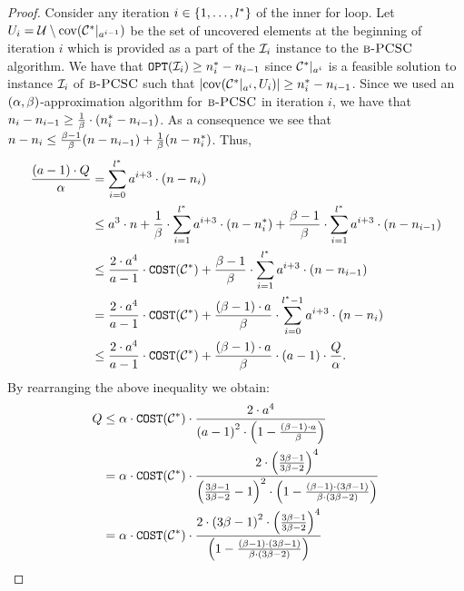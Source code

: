 \begin{proof}
        Consider any iteration $i\in \mathopen{}\left\{ 1,\dots,l^* \right\}$ of the inner for loop. Let $U_i=\mathcal{U}\setminus \operatorname{cov}\mathopen{}\left( \mathcal{C}^{*}|_{a^{i-1}} \right)$ be the set of uncovered elements at the beginning of iteration $i$ which is provided as a part of the $\mathcal{I}_i$ instance to the $\textup{\textsc{b-PCSC}}$ algorithm. We have that $\texttt{OPT}\mathopen{}\left( \mathcal{I}_i \right)\geq n_i^*-n_{i-1}$ since $\mathcal{C}^{*}|_{a^{i}}$ is a feasible solution to instance $\mathcal{I}_i$ of $\textup{\textsc{b-PCSC}}$ such that $\mathopen{}\left| \operatorname{cov}\mathopen{}\left( \mathcal{C}^{*}|_{a^{i}}, U_i \right) \right|\geq n_i^*-n_{i-1}$.
        Since we used an $\mathopen{}\left( \alpha, \beta \right)$-approximation algorithm for $\textup{\textsc{b-PCSC}}$ in iteration $i$, we have that $n_i-n_{i-1}\geq \frac{1}{\beta}\cdot\mathopen{}\left( n_i^*-n_{i-1} \right)$. As a consequence we see that $n-n_i\leq \frac{\beta-1}{\beta}\mathopen{}\left( n-n_{i-1} \right)+\frac{1}{\beta}\mathopen{}\left( n-n_{i}^* \right)$.
        Thus,
        \begin{align*}
            \frac{\mathopen{}\left( a-1 \right)\cdot Q}{\alpha}
            &=
            \sum_{i=0}^{l^*}a^{i+3}\cdot \mathopen{}\left( n-n_i \right)
            \\&\leq
            a^3\cdot n + \frac{1}{\beta}\cdot\sum_{i=1}^{l^*}a^{i+3}\cdot \mathopen{}\left( n-n_i^* \right) + \frac{\beta-1}{\beta}\cdot\sum_{i=1}^{l^*}a^{i+3}\cdot \mathopen{}\left( n-n_{i-1} \right)
            \\&\leq
            \frac{2\cdot a^4}{a-1}\cdot\texttt{COST}\mathopen{}\left( \mathcal{C}^{*} \right)+\frac{\beta-1}{\beta}\cdot\sum_{i=1}^{l^*}a^{i+3}\cdot \mathopen{}\left( n-n_{i-1} \right)
            \\&=
            \frac{2\cdot a^4}{a-1}\cdot\texttt{COST}\mathopen{}\left( \mathcal{C}^{*} \right)+\frac{\mathopen{}\left( \beta-1 \right)\cdot a}{\beta}\cdot\sum_{i=0}^{l^*-1}a^{i+3}\cdot \mathopen{}\left( n-n_{i} \right)
            \\&\leq
            \frac{2\cdot a^4}{a-1}\cdot\texttt{COST}\mathopen{}\left( \mathcal{C}^{*} \right)+\frac{\mathopen{}\left( \beta-1 \right)\cdot a}{\beta}\cdot\mathopen{}\left( a-1 \right)\cdot\frac{Q}{\alpha}.
        \end{align*}
        By rearranging the above inequality we obtain:
        \begin{align*}
            Q&\leq \alpha\cdot\texttt{COST}\mathopen{}\left( \mathcal{C}^{*} \right)\cdot\frac{2\cdot a^4}{\mathopen{}\left( a-1 \right)^2\cdot\mathopen{}\left( 1-\frac{\mathopen{}\left( \beta-1 \right)\cdot a}{\beta} \right)}
            \\&=
            \alpha\cdot\texttt{COST}\mathopen{}\left( \mathcal{C}^{*} \right)\cdot\frac{2\cdot\mathopen{}\left( \frac{3\beta-1}{3\beta-2} \right)^4}{\mathopen{}\left( \frac{3\beta-1}{3\beta-2}-1 \right)^2\cdot\mathopen{}\left( 1-\frac{\mathopen{}\left( \beta-1 \right)\cdot \mathopen{}\left( 3\beta-1 \right)}{\beta\cdot\mathopen{}\left( 3\beta-2 \right)} \right)}
            \\&=
            \alpha\cdot\texttt{COST}\mathopen{}\left( \mathcal{C}^{*} \right)\cdot\frac{2\cdot \mathopen{}\left( 3\beta-1 \right)^2\cdot \mathopen{}\left( \frac{3\beta-1}{3\beta-2} \right)^4}{\mathopen{}\left( 1-\frac{\mathopen{}\left( \beta-1 \right)\cdot \mathopen{}\left( 3\beta-1 \right)}{\beta\cdot\mathopen{}\left( 3\beta-2 \right)} \right)}
        \end{align*}

\end{proof}
